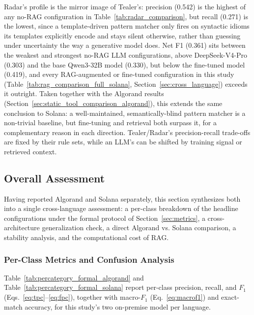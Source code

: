 \documentclass[lettersize,journal]{IEEEtran}
\begin{document}
Radar's profile is the mirror image of Tealer's: precision (0.542) is the highest of any no-RAG
configuration in Table~\ref{tab:radar_comparison}, but recall (0.271) is the lowest, since a
template-driven pattern matcher only fires on syntactic idioms its templates explicitly encode and
stays silent otherwise, rather than guessing under uncertainty the way a generative model does. Net F1
(0.361) sits between the weakest and strongest no-RAG LLM configurations, above DeepSeek-V4-Pro
(0.303) and the base Qwen3-32B model (0.330), but below the fine-tuned model (0.419), and
every RAG-augmented or fine-tuned configuration in this study
(Table~\ref{tab:rag_comparison_full_solana}, Section~\ref{sec:cross_language}) exceeds it outright.
Taken together with the Algorand results (Section~\ref{sec:static_tool_comparison_algorand}), this
extends the same conclusion to Solana: a well-maintained, semantically-blind pattern matcher is a
non-trivial baseline, but fine-tuning and retrieval both surpass it, for a complementary reason in
each direction. Tealer/Radar's precision-recall trade-offs are fixed by their rule sets, while an
LLM's can be shifted by training signal or retrieved context.

\subsection{Overall Assessment}
\label{sec:results_overall}

Having reported Algorand and Solana separately, this section synthesizes both into a single
cross-language assessment: a per-class breakdown of the headline configurations under the formal
protocol of Section~\ref{sec:metrics}, a cross-architecture generalization check, a direct
Algorand vs. Solana comparison, a stability analysis, and the computational cost of RAG.

\subsubsection{Per-Class Metrics and Confusion Analysis}
\label{sec:percategory_formal}

Table~\ref{tab:percategory_formal_algorand} and
Table~\ref{tab:percategory_formal_solana} report per-class precision, recall, and $F_1$
(Eqs.~\eqref{eq:tpc}--\eqref{eq:fpc}), together with macro-$F_1$ (Eq.~\eqref{eq:macrof1}) and
exact-match accuracy, for this study's two on-premise model per language.
\end{document}
